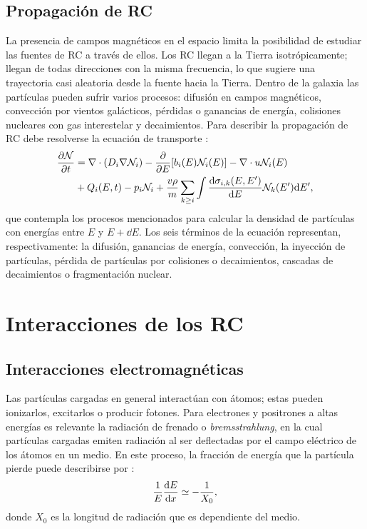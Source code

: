 	\subsection{Propagación de RC}
	La presencia de campos magnéticos en el espacio limita la posibilidad de estudiar las fuentes de RC a través de ellos. Los RC llegan a la Tierra isotrópicamente; llegan de todas direcciones con la misma frecuencia, lo que sugiere una trayectoria casi aleatoria desde la fuente hacia la Tierra. Dentro de la galaxia las partículas pueden sufrir varios procesos: difusión en campos magnéticos, convección por vientos galácticos, pérdidas o ganancias de energía, colisiones nucleares con gas interestelar y decaimientos. Para describir la propagación de RC debe resolverse la ecuación de transporte \cite{Gaisser1990}:
	\begin{align}
	\pdv{\mathcal{N}}{t} &= \nabla \cdot \qty(D_i \nabla \mathcal{N}_i)-\pdv{E} \qty[b_i(E)\mathcal{N}_i(E)]-\nabla \cdot u \mathcal{N}_i(E) \nonumber \\
	&+ Q_i(E,t) - p_i \mathcal{N}_i + \frac{v \rho}{m} \sum_{k \geq i}\int \frac{\dd \sigma_{i,k}\qty(E,E')}{\dd E}\mathcal{N}_k(E')\dd E',
	\end{align}
	que contempla los procesos mencionados para calcular la densidad de partículas con energías entre $E$ y $E+\dd E$. Los seis términos de la ecuación representan, respectivamente: la difusión, ganancias de energía, convección, la inyección de partículas, pérdida de partículas por colisiones o decaimientos, cascadas de decaimientos o fragmentación nuclear. 

\section{Interacciones de los RC}
	\subsection{Interacciones electromagnéticas}
	Las partículas cargadas en general interactúan con átomos; estas pueden ionizarlos, excitarlos o producir fotones. Para electrones y positrones a altas energías es relevante la radiación de frenado o \textit{bremsstrahlung}, en la cual partículas cargadas emiten radiación al ser deflectadas por el campo eléctrico de los átomos en un medio. En este proceso, la fracción de energía que la partícula pierde puede describirse por \cite{DeAngelis2015}:
	\begin{align}
	\frac{1}{E} \dv{E}{x} \simeq -\frac{1}{X_0},
	\end{align}
	donde $X_0$ es la longitud de radiación que es dependiente del medio.\\
	
